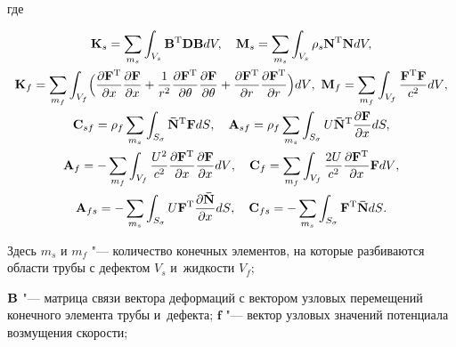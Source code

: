 \noindent

где

\begin{gather*}

{{\bf{K}}_s} = \sum_{{m_s}} {\int _{{V_s}} {{{\bf{B}}^{\rm{T}}}{\bf{DB}}{d}V,\quad {{\bf{M}}_s} = \sum_{{m_s}} {\int _{{V_s}} {\rho _s}{{{\bf{N}}^{\rm{T}}}{\bf{N}}{d}V,} } } } \\

{{\bf{K}}_f} = \sum_{{m_f}} {\int _{{V_f}} \Bigl( {\frac{{\partial {{\bf{F}}^{\rm{T}}}}}{{\partial x}}\frac{{\partial {\bf{F}}}}{{\partial x}} + \frac{1}{{{r^2}}}\frac{{\partial {{\bf{F}}^{\rm{T}}}}}{{\partial \theta }}\frac{{\partial {\bf{F}}}}{{\partial \theta }} + \frac{{\partial {{\bf{F}}^{\rm{T}}}}}{{\partial r}}\frac{{\partial {{\bf{F}}^{\rm{T}}}}}{{\partial r}}} \Bigr){d}V} , \,\, {{\bf{M}}_f} = \sum_{{m_f}} {\int _{{V_f}} {\frac{{{\bf{F}}^{\rm{T}}}{\bf{F}}}{{{c^2}}}{d}V} },

\\

{{\bf{C}}_{sf}} = {\rho _f}\sum_{{m_s}} {\int _{{S_\sigma }} {{{{\bf{\bar N}}}^{\rm{T}}}{\bf{F}}{d}S} } ,\quad {{\bf{A}}_{sf}} = {\rho _f}\sum_{{m_s}} {\int _{{S_\sigma }} {U{{{\bf{\bar N}}}^{\rm{T}}} \frac{\partial {\bf{F}}}{\partial x}}} {d}S,

\\

{{\bf{A}}_f} =  - \sum_{{m_f}} {\int _{{V_f}} {\frac{{{U^2}}}{{{c^2}}}\frac{{\partial {{\bf{F}}^{\rm{T}}}}}{{\partial x}}\frac{{\partial {\bf{F}}}}{{\partial x}}}dV}, \quad {{\bf{C}}_f} = \sum_{{m_f}} {\int _{{V_f}} {\frac{{2U}}{{{c^2}}} \frac{\partial {\bf{F}}^{\rm{T}}}{\partial x}{\bf{F}}{d}V} },

\\

{{\bf{A}}_{fs}} =  - \sum\limits_{{m_s}} {\int _{{S_\sigma }} U{{\bf{F}}^{\rm{T}}} \frac{\partial \bf{\bar

N}}{\partial x}{d}S}, \quad {{\bf{C}}_{fs}} =  - \sum\limits_{{m_s}} {\int _{{S_\sigma }} {{{\bf{F}}^{\rm{T}}}{\bf{\bar N}}{d}S} }.

\end{gather*}

Здесь $m_s$ и $m_f$ "--- количество конечных элементов, на которые разбиваются области трубы с дефектом $V_s$ и~жидкости $V_f$; 

$\bf {B}$ "--- матрица связи вектора деформаций с вектором узловых перемещений конечного элемента трубы и~дефекта; $\boldsymbol f$ "--- вектор узловых значений потенциала возмущения скорости; 

